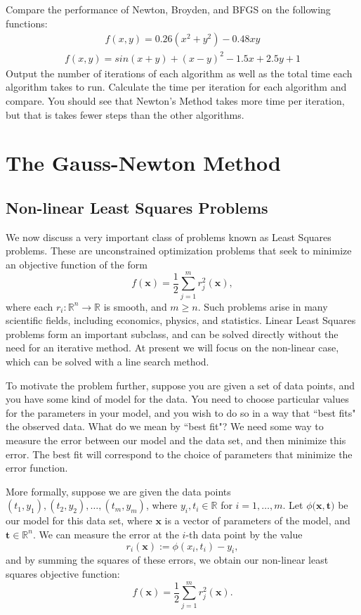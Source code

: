\begin{problem}
Compare the performance of Newton, Broyden, and BFGS on the following functions:
\begin{align*}
f(x,y) = 0.26(x^2+y^2) - 0.48xy
\end{align*}
\begin{align*}
f(x,y) = sin(x+y) + (x-y)^2 - 1.5x + 2.5y + 1
\end{align*}
Output the number of iterations of each algorithm as well as the total time
each algorithm takes to run. Calculate the time per iteration for each algorithm
and compare. You should see that Newton's Method takes more time per iteration, but
that is takes fewer steps than the other algorithms.
\end{problem}

\section*{The Gauss-Newton Method}
\subsection*{Non-linear Least Squares Problems}
We now discuss a very important class of problems known as Least Squares problems. These
are unconstrained optimization problems that seek to minimize an objective function of the form
$$
f(\mathbf{x}) = \frac{1}{2}\displaystyle\sum_{j=1}^m r_j^2(\mathbf{x}),
$$
where each $r_i : \mathbb{R}^n \rightarrow \mathbb{R}$ is smooth, and $m \geq n$. Such problems
arise in many scientific fields, including economics, physics, and statistics. Linear Least
Squares problems form an important subclass, and can be solved directly without the need for an
iterative method. At present we will focus on the non-linear case, which can be solved with a
line search method.

To motivate the problem further, suppose you are given a set of data points, and you have some kind of model for the data.
You need to choose particular values for the parameters in your model, and you wish to do so in a way that ``best fits"
the observed data. What do we mean by ``best fit"? We need some way to measure the error between our model and the data set,
and then minimize this error. The best fit will correspond to the choice of parameters that minimize the error function.

More formally, suppose we are given the data points $(t_1, y_1), (t_2, y_2), \ldots, (t_m, y_m)$, where $y_i ,t_i \in \mathbb{R}$ for $i = 1, \ldots, m$. Let $\phi(\mathbf{x}, \mathbf{t)}$ be our model for this data set, where $\mathbf{x}$ is
a vector of parameters of the model, and $\mathbf{t} \in \mathbb{R}^n$. We can measure the error at the $i$-th data point by the value
$$r_i(\mathbf{x}) := \phi(x_i, t_i) - y_i,$$ and by summing the squares of these errors, we obtain our non-linear least squares objective
function:
$$
f(\mathbf{x}) = \frac{1}{2} \displaystyle \sum_{j=1}^m  r_j^2(\mathbf{x}).
$$

